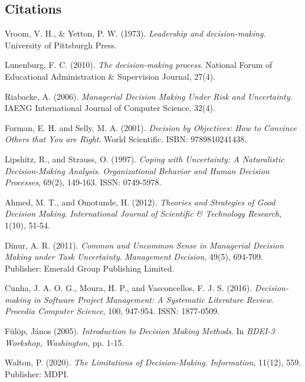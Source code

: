 \documentclass{article}
\begin{document}
\begin{thebibliography}{9}
\section*{Citations}
Vroom, V. H., \& Yetton, P. W. (1973). \textit{Leadership and decision-making.} University of Pittsburgh Press.

Lunenburg, F. C. (2010). \textit{The decision-making process}. National Forum of Educational Administration \& Supervision Journal, 27(4).

Riabacke, A. (2006). \textit{Managerial Decision Making Under Risk and Uncertainty}. IAENG International Journal of Computer Science, 32(4).

Forman, E. H. and Selly, M. A. (2001). \textit{Decision by Objectives: How to Convince Others that You are Right}. World Scientific. ISBN: 9789810241438. 

 Lipshitz, R., and Strauss, O. (1997). \textit{Coping with Uncertainty: A Naturalistic Decision-Making Analysis}. \textit{Organizational Behavior and Human Decision Processes}, 69(2), 149-163. ISSN: 0749-5978. 

Ahmed, M. T., and Omotunde, H. (2012). \textit{Theories and Strategies of Good Decision Making}. \textit{International Journal of Scientific \& Technology Research}, 1(10), 51-54.

Dinur, A. R. (2011). \textit{Common and Uncommon Sense in Managerial Decision Making under Task Uncertainty}. \textit{Management Decision}, 49(5), 694-709. Publisher: Emerald Group Publishing Limited.

Cunha, J. A. O. G., Moura, H. P., and Vasconcellos, F. J. S. (2016). \textit{Decision-making in Software Project Management: A Systematic Literature Review}. \textit{Procedia Computer Science}, 100, 947-954. ISSN: 1877-0509. 

F{\"u}l{\"o}p, J{\'a}nos (2005). \textit{Introduction to Decision Making Methods}. In \textit{BDEI-3 Workshop, Washington}, pp. 1-15.

Walton, P. (2020). \textit{The Limitations of Decision-Making}. \textit{Information}, 11(12), 559. Publisher: MDPI.


\end{thebibliography}
\end{document}
